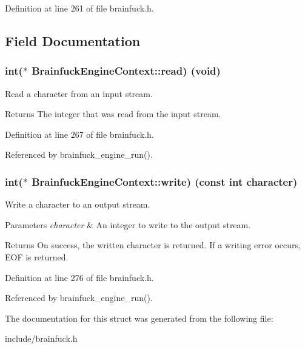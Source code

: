 Definition at line 261 of file brainfuck.\+h.



\subsection{Field Documentation}
\hypertarget{structBrainfuckEngineContext_a6b4909f710378c98e9b984afc78b9099}{}
\subsubsection[{read}]{\setlength{\rightskip}{0pt plus 5cm}int($\ast$ Brainfuck\+Engine\+Context\+::read) (void)}\label{structBrainfuckEngineContext_a6b4909f710378c98e9b984afc78b9099}


Read a character from an input stream. 

\begin{DoxyReturn}{Returns}
The integer that was read from the input stream. 
\end{DoxyReturn}


Definition at line 267 of file brainfuck.\+h.



Referenced by brainfuck\+\_\+engine\+\_\+run().

\hypertarget{structBrainfuckEngineContext_a8495230add7edb7d8f87bd1ef9771239}{}
\subsubsection[{write}]{\setlength{\rightskip}{0pt plus 5cm}int($\ast$ Brainfuck\+Engine\+Context\+::write) (const int character)}\label{structBrainfuckEngineContext_a8495230add7edb7d8f87bd1ef9771239}


Write a character to an output stream. 


\begin{DoxyParams}{Parameters}
{\em character} & An integer to write to the output stream. \\
\hline
\end{DoxyParams}
\begin{DoxyReturn}{Returns}
On success, the written character is returned. If a writing error occurs, E\+O\+F is returned. 
\end{DoxyReturn}


Definition at line 276 of file brainfuck.\+h.



Referenced by brainfuck\+\_\+engine\+\_\+run().



The documentation for this struct was generated from the following file\+:\begin{DoxyCompactItemize}
\item 
include/brainfuck.\+h\end{DoxyCompactItemize}
